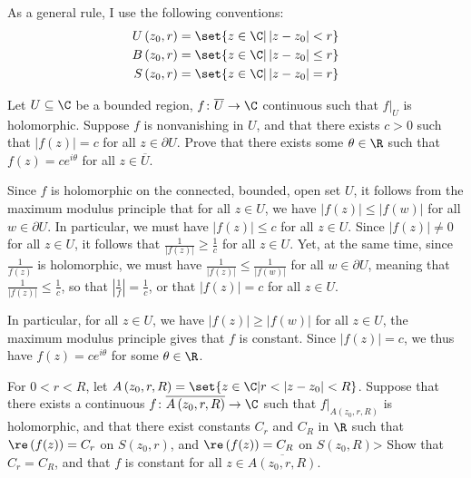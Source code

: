 \documentclass[10pt]{mypackage}
\begin{document}
\RaggedRight
\begin{remark}
  As a general rule, I use the following conventions:
  \begin{align*}
    U\left( z_0,r \right) &= \set{z\in \C | \left\vert z-z_0 \right\vert < r}\\
    B\left( z_0,r \right) &= \set{z\in \C | \left\vert z-z_0 \right\vert \leq r}\\
    S\left( z_0,r \right) &= \set{z\in \C | \left\vert z-z_0 \right\vert = r}
  \end{align*}
\end{remark}
\begin{problem}[Problem 1]
  Let $U\subseteq \C$ be a bounded region, $f\colon \overline{U}\rightarrow \C$ continuous such that $ f|_{U} $ is holomorphic. Suppose $f$ is nonvanishing in $U$, and that there exists $c > 0$ such that $ \left\vert f(z) \right\vert = c $ for all $z\in \partial U$. Prove that there exists some $\theta\in \R$ such that $f(z) = ce^{i\theta}$ for all $z\in \overline{U}$.
\end{problem}
\begin{solution}
  Since $f$ is holomorphic on the connected, bounded, open set $U$, it follows from the maximum modulus principle that for all $z\in U$, we have $\left\vert f(z) \right\vert \leq \left\vert f\left( w \right) \right\vert$ for all $w\in \partial U$. In particular, we must have $\left\vert f(z) \right\vert \leq c$ for all $z\in U$. Since $\left\vert f(z) \right\vert\neq 0$ for all $z\in U$, it follows that $ \frac{1}{\left\vert f(z) \right\vert} \geq \frac{1}{c} $ for all $z\in U$. Yet, at the same time, since $ \frac{1}{f(z)} $ is holomorphic, we must have $\frac{1}{\left\vert f(z) \right\vert} \leq \frac{1}{\left\vert f(w) \right\vert}$ for all $w\in \partial U$, meaning that $ \frac{1}{\left\vert f(z) \right\vert} \leq \frac{1}{c} $, so that $ \left\vert \frac{1}{f} \right\vert = \frac{1}{c} $, or that $ \left\vert f(z) \right\vert = c $ for all $z\in U$.\newline

  In particular, for all $z\in U$, we have $ \left\vert f(z) \right\vert \geq \left\vert f(w) \right\vert $ for all $z\in U$, the maximum modulus principle gives that $f$ is constant. Since $ \left\vert f(z) \right\vert = c $, we thus have $f(z) = ce^{i\theta}$ for some $\theta\in \R$.
\end{solution}
\begin{problem}[Problem 2]
  For $0 < r < R$, let $A\left( z_0,r,R \right) = \set{z\in \C | r < \left\vert z-z_0 \right\vert < R}$. Suppose that there exists a continuous $f\colon \overline{A\left( z_0,r,R \right)}\rightarrow \C$ such that $f|_{ A\left( z_0,r,R \right) }$ is holomorphic, and that there exist constants $C_{r}$ and $C_{R}$ in $\R$ such that $\re\left( f(z) \right) = C_{r}$ on $S\left( z_0,r \right)$, and $\re\left( f(z) \right) = C_R$ on $S\left( z_0,R \right)$> Show that $C_r = C_R$, and that $f$ is constant for all $z\in \overline{A\left( z_0,r,R \right)}$.
\end{problem}
\end{document}
